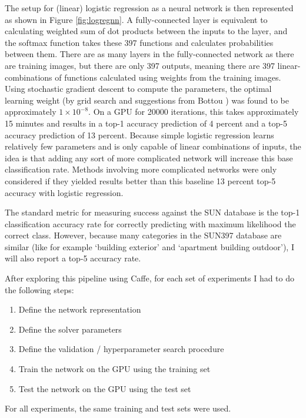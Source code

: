 \documentclass[10pt]{article}
\begin{document}
The setup for (linear) logistic regression as a neural network is then represented as shown in Figure \ref{fig:logregnn}. A fully-connected layer is equivalent to calculating weighted sum of dot products between the inputs to the layer, and the softmax function takes these 397 functions and calculates probabilities between them. There are as many layers in the fully-connected network as there are training images, but there are only 397 outputs, meaning there are 397 linear-combinations of functions calculated using weights from the training images. Using stochastic gradient descent to compute the parameters, the optimal learning weight (by grid search and suggestions from Bottou \cite{bottou_large-scale_2010}) was found to be approximately $1 \times 10^{-8}$. On a GPU for 20000 iterations, this takes approximately 15 minutes and results in a top-1 accuracy prediction of 4 percent and a top-5 accuracy prediction of 13 percent. Because simple logistic regression learns relatively few parameters and is only capable of linear combinations of inputs, the idea is that adding any sort of more complicated network will increase this base classification rate. Methods involving more complicated networks were only considered if they yielded results better than this baseline 13 percent top-5 accuracy with logistic regression. 

The standard metric for measuring success against the SUN database is the top-1 classification accuracy rate for correctly predicting with maximum likelihood the correct class. However, because many categories in the SUN397 database are similar (like for example `building exterior' and `apartment building outdoor'), I will also report a top-5 accuracy rate.

After exploring this pipeline using Caffe, for each set of experiments I had to do the following steps: 

\begin{enumerate}
	\item Define the network representation
	\item Define the solver parameters
	\item Define the validation / hyperparameter search procedure
	\item Train the network on the GPU using the training set
	\item Test the network on the GPU using the test set
\end{enumerate}

For all experiments, the same training and test sets were used. 
\end{document}
